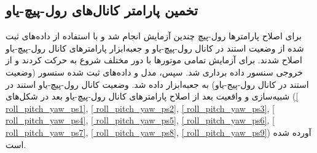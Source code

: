 \subsection{تخمین پارامتر کانال‌های رول-پیچ-یاو}
برای اصلاح پارامترها رول-پیچ چندین آزمایش انجام شد و با استفاده از داده‌های ثبت شده از وضعیت استند در کانال رول-پپچ-یاو و جعبه‌ابزار
پارامترهای کانال رول-پیچ-یاو اصلاح شدند.
برای آزمایش تمامی موتورها با دور مختلف شروع به حرکت کردند و از خروجی سنسور داده برداری شد. سپس، مدل و  داده‌های ثبت شده سنسور (وضعیت استند در کانال رول-پیج-یاو) به جعبه‌ابزار
داده شد. وضعیت کانال رول-پیچ-یاو استند در شبیه‌سازی و واقعیت بعد از اصلاح پارامترهای کانال‌ رول-پیچ-یاو بعد در شکل‌های
(\ref{ roll_pitch_yaw_ps1}, \ref{ roll_pitch_yaw_ps2}, \ref{ roll_pitch_yaw_ps3}, \ref{ roll_pitch_yaw_ps4}, \ref{ roll_pitch_yaw_ps5}, \ref{ roll_pitch_yaw_ps6}, \ref{ roll_pitch_yaw_ps7}, \ref{ roll_pitch_yaw_ps8}, \ref{ roll_pitch_yaw_ps9})
آورده شده است.

